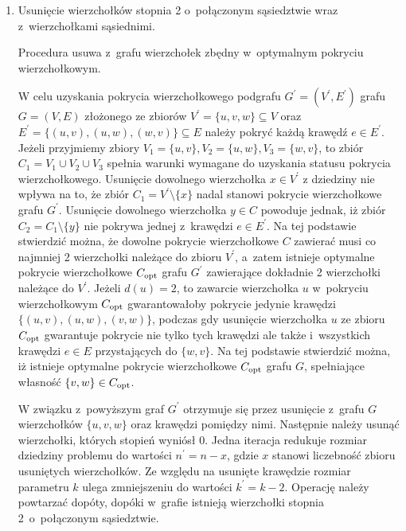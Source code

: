 \begin{enumerate}
  \item Usunięcie wierzchołków stopnia 2 o~połączonym sąsiedztwie wraz z~wierzchołkami sąsiednimi.   
    \begin{theorem}
      Procedura usuwa z~grafu wierzchołek zbędny w~optymalnym pokryciu wierzchołkowym.
    \end{theorem}
    \begin{bproof}
      W celu uzyskania pokrycia wierzchołkowego podgrafu $G^\prime=(V^\prime,E^\prime)$
      grafu $G=(V,E)$ złożonego ze zbiorów $ V^\prime=\{u, v, w\} \subseteq V$ oraz $E^\prime=\{(u,v), (u,w), (w,v)\} \subseteq E$ należy pokryć każdą krawędź $e \in E^\prime$.
      Jeżeli przyjmiemy zbiory ${V_1=\{u,v\}, V_2=\{u,w\}, V_3=\{w,v\}}$, to zbiór $C_1=V_1 \cup V_2 \cup V_3$ spełnia warunki wymagane do uzyskania 
      statusu pokrycia wierzchołkowego.
      Usunięcie dowolnego wierzchołka $x \in V^\prime$ z dziedziny nie wpływa na to, że zbiór ${C_1=V^\prime \setminus \{x\}}$ nadal stanowi pokrycie wierzchołkowe grafu $G^\prime$.
      Usunięcie dowolnego wierzchołka $y \in C$ powoduje jednak, iż zbiór $C_2=C_1 \setminus \{y\}$ nie pokrywa jednej z~krawędzi $e \in E^\prime$.
      Na tej podstawie stwierdzić można, że dowolne pokrycie wierzchołkowe $C$ zawierać musi co najmniej 2 wierzchołki należące do zbioru $V^\prime$, a~zatem istnieje optymalne pokrycie wierzchołkowe $C_{\textnormal{opt}}$ grafu $G^\prime$ zawierające dokładnie 2 wierzchołki należące do $V^\prime$.
      Jeżeli $d(u)=2$, to zawarcie wierzchołka $u$ w~pokryciu wierzchołkowym $C_{\textnormal{opt}}$ gwarantowałoby pokrycie jedynie krawędzi $\{(u,v), (u,w), (v,w)\}$, podczas gdy usunięcie wierzchołka $u$ ze zbioru $C_{\textnormal{opt}}$ gwarantuje pokrycie nie tylko tych krawędzi ale także i~wszystkich krawędzi $e \in E$ przystających do $\{w, v\}$.
      Na tej podstawie stwierdzić można, iż istnieje optymalne pokrycie wierzchołkowe $C_{\textnormal{opt}}$ grafu $G$, spełniające własność $\{v,w\} \in C_{\textnormal{opt}}$.
    \end{bproof}
    W związku z~powyższym graf $G^\prime$ otrzymuje się przez usunięcie z~grafu $G$ wierzchołków $\{u,v,w\}$ oraz krawędzi pomiędzy nimi.
    Następnie należy usunąć wierzchołki, których stopień wyniósł 0.
    Jedna iteracja redukuje rozmiar dziedziny problemu do wartości $n^\prime=n-x$, gdzie $x$ stanowi liczebność zbioru usuniętych wierzchołków.
    Ze względu na usunięte krawędzie rozmiar parametru $k$ ulega zmniejszeniu do wartości $k^\prime=k-2$.
    Operację należy powtarzać dopóty, dopóki w~grafie istnieją wierzchołki stopnia 2\ o~połączonym sąsiedztwie.

\end{enumerate}
